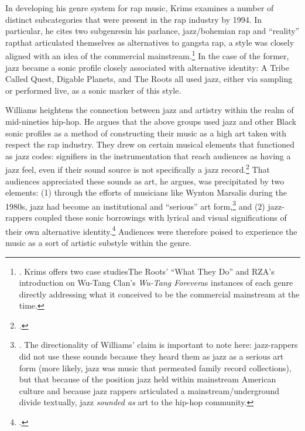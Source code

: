In developing his genre system for rap music, Krims examines a number of distinct subcategories that were 
present in the rap industry by 1994. In particular, he cites two subgenres\textemdash in his parlance, 
jazz/bohemian rap and ``reality'' rap\textemdash that articulated themselves as alternatives to gangsta
rap, a style was closely aligned with an idea of the commercial mainstream.\footnote{
    \autocite[64--65]{adamkrimsRapMusicPoetics2000}. Krims offers two case studies\textemdash The Roots' 
    ``What They Do'' and RZA's introduction on Wu-Tang Clan's \textit{Wu-Tang Forever}\textemdash as 
    instances of each genre directly addressing what it conceived to be the commercial mainstream at
    the time.}
In the case of the former, jazz became a sonic profile closely associated with alternative identity:
A Tribe Called Quest, Digable Planets, and The Roots all used jazz, either via sampling or performed
live, as a sonic marker of this style.

Williams heightens the connection between jazz and artistry within the realm of mid-nineties hip-hop. 
He argues that the above groups used jazz and other Black sonic profiles as a method of constructing 
their music as a high art taken with respect the rap industry. They drew on certain musical elements
that functioned as jazz codes: signifiers in the instrumentation that reach audiences as having a jazz
feel, even if their sound source is not specifically a jazz record.\footnote{
    \autocite[55]{justinawilliamsRhyminStealinMusical2013}.}
That audiences appreciated these sounds as art, he argues, was precipitated by two elements: (1) through
the efforts of  musicians like Wynton Marsalis during the 1980s, jazz had become an institutional and 
``serious'' art form,\footnote{
    \autocite[48--52]{justinawilliamsRhyminStealinMusical2013}. The directionality of Williams' claim 
    is important to note here: jazz-rappers did not use these sounds because they heard them as jazz 
    as a serious art form (more likely, jazz was music that permeated family record collections), but
    that because of the position jazz held within mainstream American culture and because jazz rappers
    articulated a mainstream/underground divide textually, jazz \emph{sounded as} art to the hip-hop 
    community.} 
and (2) jazz-rappers coupled these sonic borrowings with lyrical and visual significations of their 
own alternative identity.\footnote{
    \autocite[55--64]{justinawilliamsRhyminStealinMusical2013}.}
Audiences were therefore poised to experience the music as a sort of artistic substyle within the genre.

